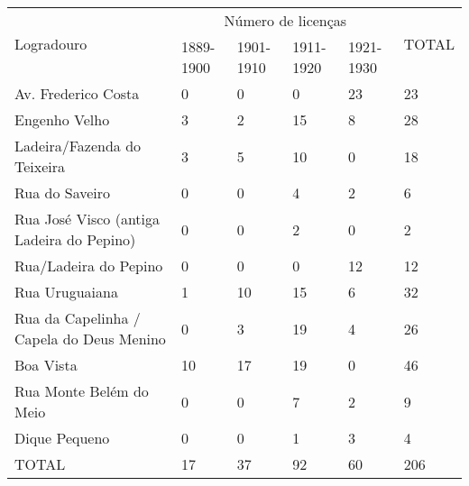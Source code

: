 \begin{table}[!htp]
{
\begin{tiny}
\begin{tabular}{llllll}
\toprule
\multirow{2}{*}{Logradouro}	& \multicolumn{4}{c}{Número de licenças}	& \multirow{2}{*}{TOTAL}\\
\cline{2-5}
	&1889-1900	&1901-1910	&1911-1920	&1921-1930	& \\
\midrule
\midrule
Av. Frederico Costa	&0	&0	&0	&23	&23\\
Engenho Velho	&3	&2	&15	&8	&28\\
Ladeira/Fazenda do Teixeira	&3	&5	&10	&0	&18\\
Rua do Saveiro	&0	&0	&4	&2	&6\\
Rua José Visco (antiga Ladeira do Pepino)	&0	&0	&2	&0	&2\\
Rua/Ladeira do Pepino	&0	&0	&0	&12	&12\\
Rua Uruguaiana	&1	&10	&15	&6	&32\\
Rua da Capelinha / Capela do Deus Menino	&0	&3	&19	&4	&26\\
Boa Vista	&10	&17	&19	&0	&46\\
Rua Monte Belém do Meio	&0	&0	&7	&2	&9\\
Dique Pequeno	&0	&0	&1	&3	&4\\
\midrule
TOTAL	&17	&37	&92	&60	&206\\
\bottomrule
\end{tabular} 
\end{tiny}
}
{}
\end{table}